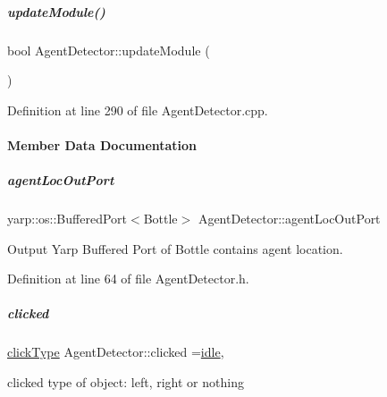 \mbox{\label{group__agentDetector_a7efc1a96bdabfa4f2d995277df21132e}} 
\subparagraph{\texorpdfstring{update\+Module()}{updateModule()}}
{\footnotesize\ttfamily bool Agent\+Detector\+::update\+Module (\begin{DoxyParamCaption}{ }\end{DoxyParamCaption})}



Definition at line 290 of file Agent\+Detector.\+cpp.



\paragraph{Member Data Documentation}
\mbox{\label{group__agentDetector_abf1d4495bc0e3521788c73b526704ac4}} 
\subparagraph{\texorpdfstring{agent\+Loc\+Out\+Port}{agentLocOutPort}}
{\footnotesize\ttfamily yarp\+::os\+::\+Buffered\+Port$<$Bottle$>$ Agent\+Detector\+::agent\+Loc\+Out\+Port\hspace{0.3cm}{\ttfamily [protected]}}



Output Yarp Buffered Port of Bottle contains agent location. 



Definition at line 64 of file Agent\+Detector.\+h.

\mbox{\label{group__agentDetector_ad4e5781343294574e5f3e4fd71d45c12}} 
\subparagraph{\texorpdfstring{clicked}{clicked}}
{\footnotesize\ttfamily \hyperlink{group__agentDetector_ga25ebeb7c406dcf4415f5126894542df2}{click\+Type} Agent\+Detector\+::clicked =\hyperlink{group__agentDetector_gga25ebeb7c406dcf4415f5126894542df2a0e9a37114c0e458d28d52f06ec0f2242}{idle}\hspace{0.3cm}{\ttfamily [static]}, {\ttfamily [protected]}}



clicked type of object\+: left, right or nothing 



